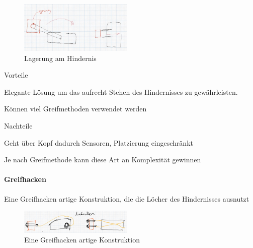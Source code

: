 \begin{figure}
        \centering
        \includegraphics[width=0.48\textwidth]{img/technologierecherche/Rotation/ueberkopf_objekt_gelagert.jpg}
        \caption{Lagerung am Hindernis } 
        \label{img:tech_ueberkopf_objekt_gelagert}
\end{figure}

\begin{minipage}[t]{0.48\textwidth}
    \begin{items}
          \item [Vorteile]
          \item Elegante Lösung um das aufrecht Stehen des Hindernisses zu gewährleisten.
          \item Können viel Greifmethoden verwendet werden
    \end{items}
\end{minipage}
\hfill
\begin{minipage}[t]{0.48\textwidth}
    \begin{items}
          \item [Nachteile]
          \item Geht über Kopf dadurch Sensoren, Platzierung eingeschränkt
          \item Je nach Greifmethode kann diese Art an Komplexität gewinnen
    \end{items}
\end{minipage}
\newpage
\paragraph{Greifhacken}
Eine Greifhacken artige Konstruktion, die die Löcher des Hindernisses ausnutzt

\begin{figure}[h!]
        \centering
        \includegraphics[width=0.48\textwidth]{img/technologierecherche/Rotation/harponne.jpg}
        \caption{Eine Greifhacken artige Konstruktion}
        \label{img:tech_harponne}
\end{figure}


